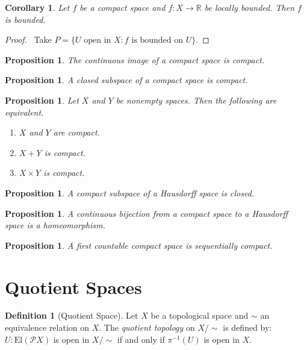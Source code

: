 \documentclass{book}
\let\qed\relax
\newtheorem{prop}[ax]{Proposition}
\newtheorem{cor}{Corollary}[ax]
\theoremstyle{definition}
\newtheorem{df}[ax]{Definition}
\newcommand{\El}[1]{\ensuremath{\mathrm{El} \left( {#1} \right)}}
\newcommand{\inv}[1]{\ensuremath{{#1}^{-1}}}
\begin{document}
\begin{cor}
Let $f$ be a compact space and $f : X \rightarrow \mathbb{R}$ be locally bounded. Then $f$ is bounded.
\end{cor}

\begin{proof}
\pf\ Take $P = \{ U \text{ open in } X : f \text{ is bounded on } U \}$. \qed
\end{proof}

\begin{prop}
The continuous image of a compact space is compact.
\end{prop}

\begin{prop}
A closed subspace of a compact space is compact.
\end{prop}

\begin{prop}
Let $X$ and $Y$ be nonempty spaces. Then the following are equivalent.
\begin{enumerate}
\item $X$ and $Y$ are compact.
\item $X + Y$ is compact.
\item $X \times Y$ is compact.
\end{enumerate}
\end{prop}

\begin{prop}
A compact subspace of a Hausdorff space is closed.
\end{prop}

\begin{prop}
A continuous bijection from a compact space to a Hausdorff space is a homeomorphism.
\end{prop}

\begin{prop}
A first countable compact space is sequentially compact.
\end{prop}


\section{Quotient Spaces}

\begin{df}[Quotient Space]
Let $X$ be a topological space and $\sim$ an equivalence relation on $X$. The \emph{quotient topology} on $X / \sim$ is defined by: $U : \El{\mathcal{P} X}$ is open in $X / \sim$ if and only if $\inv{\pi}(U)$ is open in $X$.
\end{df}
\end{document}
